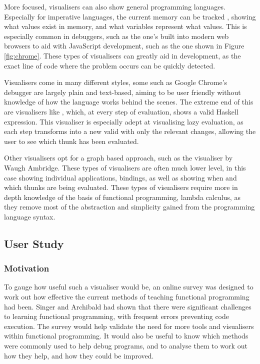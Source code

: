 More focused, visualisers can also show general programming languages. Especially for imperative languages, the current memory can be tracked \cite{cscircles-vis}, showing what values exist in memory, and what variables represent what values. This is especially common in debuggers, such as the one's built into modern web browsers to aid with JavaScript development, such as the one shown in Figure \ref{fig:chrome}. These types of visualisers can greatly aid in development, as the exact line of code where the problem occurs can be quickly detected.


Visualisers come in many different styles, some such as Google Chrome's debugger are largely plain and text-based, aiming to be user friendly without knowledge of how the language works behind the scenes. The extreme end of this are visualisers like \cite{visualize-cbn}, which, at every step of evaluation, shows a valid Haskell expression. This visualiser is especially adept at visualising lazy evaluation, as each step transforms into a new valid with only the relevant changes, allowing the user to see which thunk has been evaluated.

Other visualisers opt for a graph based approach, such as the \cite{SPARTAN} visualiser by Waugh Ambridge. These types of visualisers are often much lower level, in this case showing individual applications, bindings, as well as showing when and which thunks are being evaluated. These types of visualisers require more in depth knowledge of the basis of functional programming, lambda calculus, as they remove most of the abstraction and simplicity gained from the programming language syntax.

\subsection{User Study}
\subsubsection{Motivation}
To gauge how useful such a visualiser would be, an online survey was designed to work out how effective the current methods of teaching functional programming had been. Singer and Archibald \cite{singer2018functional} had shown that there were significant challenges to learning functional programming, with frequent errors preventing code execution. The survey would help validate the need for more tools and visualisers within functional programming. It would also be useful to know which methods were commonly used to help debug programs, and to analyse them to work out how they help, and how they could be improved.

